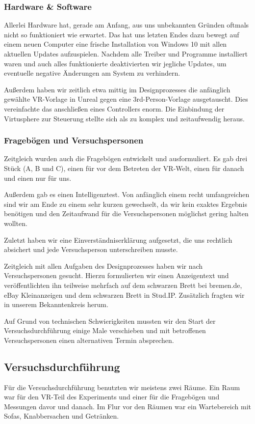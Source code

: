 \documentclass{Bericht}
\begin{document}
		\subsubsection{Hardware \& Software}
			Allerlei Hardware hat, gerade am Anfang, aus uns unbekannten Gründen oftmals nicht so funktioniert wie erwartet. Das hat uns letzten Endes dazu bewegt auf einem neuen Computer eine frische Installation von Windows 10 mit allen aktuellen Updates aufzuspielen. Nachdem alle Treiber und Programme installiert waren und auch alles funktionierte deaktivierten wir jegliche Updates, um eventuelle negative Änderungen am System zu verhindern. 
			
			Außerdem haben wir zeitlich etwa mittig im Designprozesses die anfänglich gewählte VR-Vorlage in Unreal gegen eine 3rd-Person-Vorlage ausgetauscht. Dies vereinfachte das anschließen eines Controllers enorm. Die Einbindung der Virtusphere zur Steuerung stellte sich als zu komplex und zeitaufwendig heraus. 
		
		\subsubsection{Fragebögen und Versuchspersonen}
			Zeitgleich wurden auch die Fragebögen entwickelt und ausformuliert. Es gab drei Stück (A, B und C), einen für vor dem Betreten der VR-Welt, einen für danach und einen nur für uns.
			
			Außerdem gab es einen Intelligenztest. Von anfänglich einem recht umfangreichen sind wir am Ende zu einem sehr kurzen gewechselt, da wir kein exaktes Ergebnis benötigen und den Zeitaufwand für die Versuchspersonen möglichst gering halten wollten.
			
			Zuletzt haben wir eine Einverständniserklärung aufgesetzt, die uns rechtlich absichert und jede Versuchsperson unterschreiben musste.
			
			Zeitgleich mit allen Aufgaben des Designprozesses haben wir nach Versuchspersonen gesucht. Hierzu formulierten wir einen Anzeigentext und veröffentlichten ihn teilweise mehrfach auf dem schwarzen Brett bei bremen.de, eBay Kleinanzeigen und dem schwarzen Brett in Stud.IP. Zusätzlich fragten wir in unserem Bekanntenkreis herum. 
			
			Auf Grund von technischen Schwierigkeiten mussten wir den Start der Versuchsdurchführung einige Male verschieben und mit betroffenen Versuchspersonen einen alternativen Termin absprechen. 
		
	\subsection{Versuchsdurchführung} %
		Für die Versuchsdurchführung benutzten wir meistens zwei Räume. Ein Raum war für den VR-Teil des Experiments und einer für die Fragebögen und Messungen davor und danach. Im Flur vor den Räumen war ein Wartebereich mit Sofas, Knabbersachen und Getränken. 
		
\end{document}
